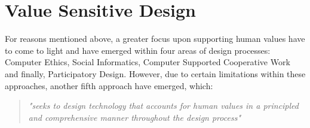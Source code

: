 
\section{Value Sensitive Design}
\label{subsec:vsd_framework}
For reasons mentioned above, a greater focus upon supporting human values have to come to light and have emerged within four areas of design processes: Computer Ethics, Social Informatics, Computer Supported Cooperative Work and finally, Participatory Design\citep[p. 3]{FriedmanVSDandIS}. However, due to certain limitations within these approaches, another fifth approach have emerged, which: 
\begin{quotation}
\textit{"seeks to design technology that accounts for human values in a principled and comprehensive manner throughout the design process"} \citep[p. 1186]{HumanValuesEthicsAndDesign}
\end{quotation}

